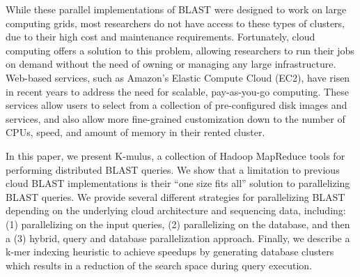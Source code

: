

While these parallel implementations of BLAST were designed to work on large computing grids, most researchers do not have access to these types of clusters, due to their high cost and maintenance requirements.
Fortunately, cloud computing offers a solution to this problem, allowing researchers to run their jobs on demand without the need of owning or managing any large infrastructure.
Web-based services, such as Amazon’s Elastic Compute Cloud (EC2)\cite{inc_amazon_2008}, have risen in recent years to address the need for scalable, pay-as-you-go computing.
These services allow users to select from a collection of pre-configured disk images and services, and also allow more fine-grained customization down to the number of CPUs, speed, and amount of memory in their rented cluster.

In this paper, we present K-mulus, a collection of Hadoop MapReduce tools for performing distributed BLAST queries.
We show that a limitation to previous cloud BLAST implementations is their ``one size fits all'' solution to parallelizing BLAST queries.
We provide several different strategies for parallelizing BLAST depending on the underlying cloud architecture and sequencing data, including: (1) parallelizing on the input queries, (2) parallelizing on the database, and then a (3) hybrid, query and database parallelization approach.
Finally, we describe a k-mer indexing heuristic to achieve speedups by generating database clusters which results in a reduction of the search space during query execution.



